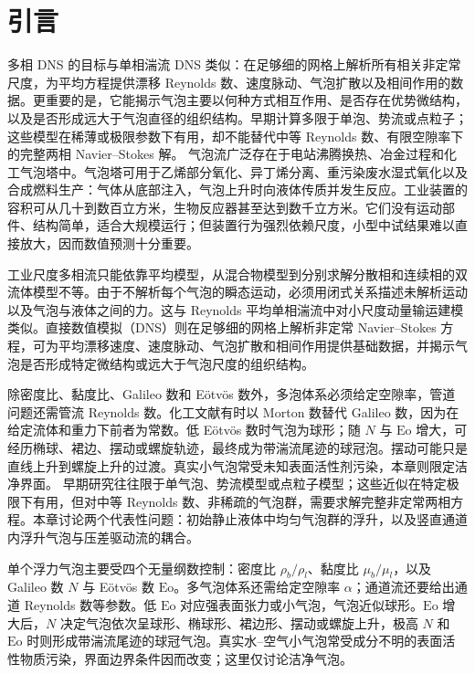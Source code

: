 \documentclass[11pt,a4paper,openany,fontset=none]{ctexbook}
\begin{document}
\section{引言}

多相 DNS 的目标与单相湍流 DNS 类似：在足够细的网格上解析所有相关非定常尺度，为平均方程提供漂移 Reynolds 数、速度脉动、气泡扩散以及相间作用的数据。更重要的是，它能揭示气泡主要以何种方式相互作用、是否存在优势微结构，以及是否形成远大于气泡直径的组织结构。早期计算多限于单泡、势流或点粒子；这些模型在稀薄或极限参数下有用，却不能替代中等 Reynolds 数、有限空隙率下的完整两相 Navier--Stokes 解。
气泡流广泛存在于电站沸腾换热、冶金过程和化工气泡塔中。气泡塔可用于乙烯部分氧化、异丁烯分离、重污染废水湿式氧化以及合成燃料生产：气体从底部注入，气泡上升时向液体传质并发生反应。工业装置的容积可从几十到数百立方米，生物反应器甚至达到数千立方米。它们没有运动部件、结构简单，适合大规模运行；但装置行为强烈依赖尺度，小型中试结果难以直接放大，因而数值预测十分重要。

工业尺度多相流只能依靠平均模型，从混合物模型到分别求解分散相和连续相的双流体模型不等。由于不解析每个气泡的瞬态运动，必须用闭式关系描述未解析运动以及气泡与液体之间的力。这与 Reynolds 平均单相湍流中对小尺度动量输运建模类似。直接数值模拟（DNS）则在足够细的网格上解析非定常 Navier--Stokes 方程，可为平均漂移速度、速度脉动、气泡扩散和相间作用提供基础数据，并揭示气泡是否形成特定微结构或远大于气泡尺度的组织结构。

除密度比、黏度比、Galileo 数和 Eötvös 数外，多泡体系必须给定空隙率，管道问题还需管流 Reynolds 数。化工文献有时以 Morton 数替代 Galileo 数，因为在给定流体和重力下前者为常数。低 Eötvös 数时气泡为球形；随 $N$ 与 $\mathrm{Eo}$ 增大，可经历椭球、裙边、摆动或螺旋轨迹，最终成为带湍流尾迹的球冠泡。摆动可能只是直线上升到螺旋上升的过渡。真实小气泡常受未知表面活性剂污染，本章则限定洁净界面。
早期研究往往限于单气泡、势流模型或点粒子模型；这些近似在特定极限下有用，但对中等 Reynolds 数、非稀疏的气泡群，需要求解完整非定常两相方程。本章讨论两个代表性问题：初始静止液体中均匀气泡群的浮升，以及竖直通道内浮升气泡与压差驱动流的耦合。

单个浮力气泡主要受四个无量纲数控制：密度比 $\rho_b/\rho_l$、黏度比 $\mu_b/\mu_l$，以及 Galileo 数 $N$ 与 Eötvös 数 $\mathrm{Eo}$。多气泡体系还需给定空隙率 $\alpha$；通道流还要给出通道 Reynolds 数等参数。低 $\mathrm{Eo}$ 对应强表面张力或小气泡，气泡近似球形。$\mathrm{Eo}$ 增大后，$N$ 决定气泡依次呈球形、椭球形、裙边形、摆动或螺旋上升，极高 $N$ 和 $\mathrm{Eo}$ 时则形成带湍流尾迹的球冠气泡。真实水--空气小气泡常受成分不明的表面活性物质污染，界面边界条件因而改变；这里仅讨论洁净气泡。
\end{document}
